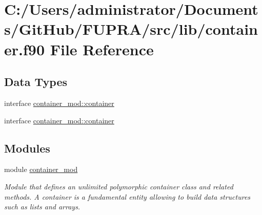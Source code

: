 \hypertarget{container_8f90}{}\section{C\+:/\+Users/administrator/\+Documents/\+Git\+Hub/\+F\+U\+P\+R\+A/src/lib/container.f90 File Reference}
\label{container_8f90}
\subsection*{Data Types}
\begin{DoxyCompactItemize}
\item 
interface \mbox{\hyperlink{structcontainer__mod_1_1container}{container\+\_\+mod\+::container}}
\item 
interface \mbox{\hyperlink{structcontainer__mod_1_1container}{container\+\_\+mod\+::container}}
\end{DoxyCompactItemize}
\subsection*{Modules}
\begin{DoxyCompactItemize}
\item 
module \mbox{\hyperlink{namespacecontainer__mod}{container\+\_\+mod}}
\begin{DoxyCompactList}\small\item\em Module that defines an unlimited polymorphic container class and related methods. A container is a fundamental entity allowing to build data structures such as lists and arrays. \end{DoxyCompactList}\end{DoxyCompactItemize}
